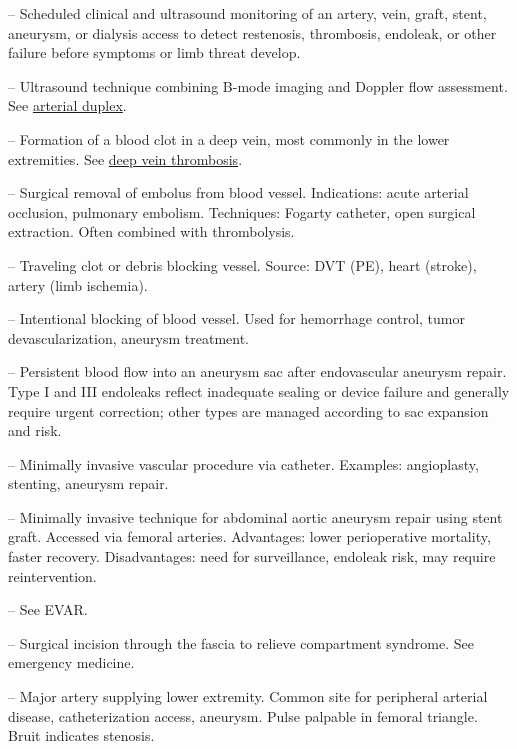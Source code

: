 -- Scheduled clinical and ultrasound monitoring of an artery, vein, graft, stent, aneurysm, or dialysis access to detect restenosis, thrombosis, endoleak, or other failure before symptoms or limb threat develop.

-- Ultrasound technique combining B-mode imaging and Doppler flow assessment. See \hyperlink{Arterial Duplex}{arterial duplex}.

-- Formation of a blood clot in a deep vein, most commonly in the lower extremities. See \hyperlink{Deep Vein Thrombosis}{deep vein thrombosis}.

-- Surgical removal of embolus from blood vessel. Indications: acute arterial occlusion, pulmonary embolism. Techniques: Fogarty catheter, open surgical extraction. Often combined with thrombolysis.

-- Traveling clot or debris blocking vessel. Source: DVT (PE), heart (stroke), artery (limb ischemia).

-- Intentional blocking of blood vessel. Used for hemorrhage control, tumor devascularization, aneurysm treatment.


-- Persistent blood flow into an aneurysm sac after endovascular aneurysm repair. Type I and III endoleaks reflect inadequate sealing or device failure and generally require urgent correction; other types are managed according to sac expansion and risk.


-- Minimally invasive vascular procedure via catheter. Examples: angioplasty, stenting, aneurysm repair.


-- Minimally invasive technique for abdominal aortic aneurysm repair using stent graft. Accessed via femoral arteries. Advantages: lower perioperative mortality, faster recovery. Disadvantages: need for surveillance, endoleak risk, may require reintervention.

-- See EVAR.

-- Surgical incision through the fascia to relieve compartment syndrome. See emergency medicine.

-- Major artery supplying lower extremity. Common site for peripheral arterial disease, catheterization access, aneurysm. Pulse palpable in femoral triangle. Bruit indicates stenosis.

